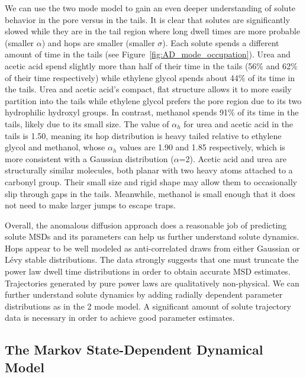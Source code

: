 \documentclass[journal=jctcce,manuscript=article]{achemso}
\begin{document}
  We can use the two mode model to gain an even deeper understanding of solute
  behavior in the pore versus in the tails. It is clear that solutes are
  significantly slowed while they are in the tail region where long dwell times
  are more probable (smaller $\alpha$) and hops are smaller (smaller $\sigma$).
  Each solute spends a different amount of time in the tails (see
  Figure~\ref{fig:AD_mode_occupation}). Urea and acetic acid spend slightly
  more than half of their time in the tails (56\% and 62\% of their time
  respectively) while ethylene glycol spends about 44\% of its time in the
  tails. Urea and acetic acid's compact, flat structure allows it to more
  easily partition into the tails while ethylene glycol prefers the pore region
  due to its two hydrophilic hydroxyl groups. In contrast, methanol spends 91\%
  of its time in the tails, likely due to its small size. The value of
  $\alpha_h$ for urea and acetic acid in the tails is 1.50, meaning its hop
  distribution is heavy tailed relative to ethylene glycol and methanol, whose
  $\alpha_h$ values are 1.90 and 1.85 respectively, which is more consistent
  with a Gaussian distribution ($\alpha$=2). Acetic acid and urea are
  structurally similar molecules, both planar with two heavy atoms attached to
  a carbonyl group. Their small size and rigid shape may allow them to
  occasionally slip through gaps in the tails. Meanwhile, methanol is small
  enough that it does not need to make larger jumps to escape traps.

  Overall, the anomalous diffusion approach does a reasonable job of predicting solute MSDs and
  its parameters can help us further understand solute dynamics. Hops appear to
  be well modeled as anti-correlated draws from either Gaussian or L\'evy
  stable distributions. The data strongly suggests that one must truncate the
  power law dwell time distributions in order to obtain accurate MSD estimates.
  Trajectories generated by pure power laws are qualitatively non-physical. We
  can further understand solute dynamics by adding radially dependent parameter
  distributions as in the 2 mode model. A significant amount of solute
  trajectory data is necessary in order to achieve good parameter estimates. 

  \subsection{The Markov State-Dependent Dynamical Model}\label{section:msm_results}
  
\end{document}
